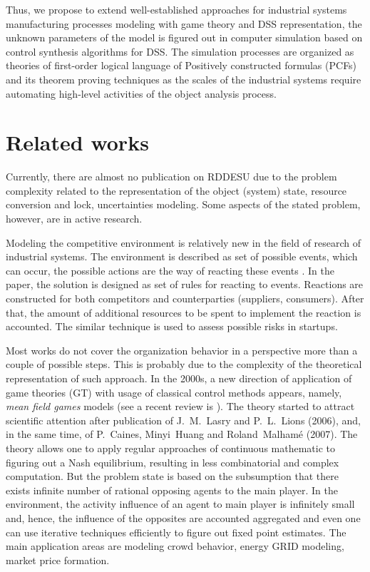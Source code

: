 \documentclass[conference]{IEEEtran}
\begin{document}
Thus, we propose to extend well-established approaches for industrial systems manufacturing processes modeling with game theory and DSS representation, the unknown parameters of the model is figured out in computer simulation based on control synthesis algorithms for DSS.  The simulation processes are organized as theories of first-order logical language of Positively constructed formulas (PCFs) and its theorem proving techniques as the scales of the industrial systems require automating high-level activities of the object analysis process.

\section{Related works}
\label{sec:rel-works}

Currently, there are almost no publication on RDDESU due to the problem complexity related to the representation of the object (system) state, resource conversion and lock, uncertainties modeling.  Some aspects of the stated problem, however, are in active research.

Modeling the competitive environment is relatively new in the field of research of industrial systems. The environment is described as set of possible events, which can occur, the possible actions are the way of reacting these events \cite{andres,ahmed}. In the paper, the solution is designed as set of rules for reacting to events. Reactions are constructed for both competitors and counterparties (suppliers, consumers). After that, the amount of additional resources to be spent to implement the reaction is accounted.  The similar technique is used to assess possible risks in startups.

Most works do not cover the organization behavior in a perspective more than a couple of possible steps. This is probably due to the complexity of the theoretical representation of such approach. In the 2000s, a new direction of application of game theories (GT) with usage of classical control methods appears, namely, \emph{mean field games} models (see a recent review is \cite{gomes}). The theory started to attract scientific attention after publication of J.~M.~Lasry and P.~L.~Lions (2006), and, in the same time, of P.~Caines, Minyi~Huang and Roland~Malhamé (2007). The theory allows one to apply regular approaches of continuous mathematic to figuring out a Nash equilibrium, resulting in less combinatorial and complex computation. But the problem state is based on the subsumption that there exists infinite number of rational opposing agents to the main player. In the environment, the activity influence of an agent to main player is infinitely small and, hence, the influence of the opposites are accounted aggregated and even one can use iterative techniques efficiently to figure out fixed point estimates. The main application areas are modeling crowd behavior, energy GRID modeling, market price formation.
\end{document}
